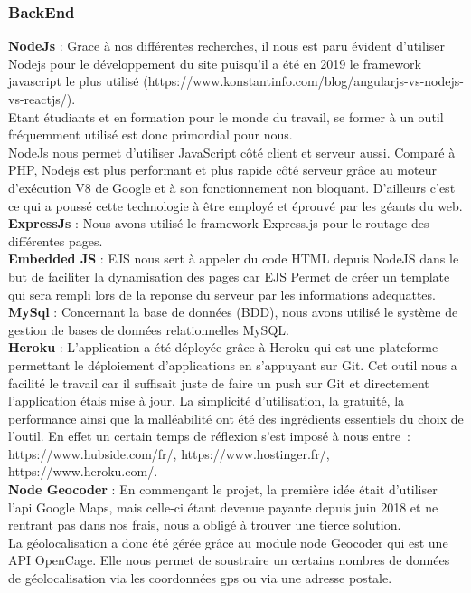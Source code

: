 \documentclass{article}
\begin{document}
\subsubsection{BackEnd}
\textbf{NodeJs} : Grace à nos différentes recherches, il nous est paru évident d’utiliser Nodejs pour le développement du site puisqu’il a été en 2019 le framework javascript le plus utilisé (https://www.konstantinfo.com/blog/angularjs-vs-nodejs-vs-reactjs/). \\ Etant étudiants et en formation pour le monde du travail, se former à un outil fréquemment utilisé est donc primordial pour nous. \\
NodeJs nous permet d’utiliser JavaScript côté client et serveur aussi. Comparé à PHP, Nodejs est plus performant et plus rapide côté serveur grâce au moteur d’exécution V8 de Google et à son fonctionnement non bloquant. D’ailleurs c’est ce qui a poussé cette technologie à être employé et éprouvé par les géants du web. \\
\textbf{ExpressJs} :
Nous avons utilisé le framework Express.js pour le routage des différentes pages. \\ 
\textbf{Embedded JS} :
EJS nous sert à appeler du code HTML depuis NodeJS dans le but de faciliter la dynamisation des pages car EJS Permet de créer un template qui sera rempli lors de la reponse du serveur par les informations adequattes. \\
\textbf{MySql} :
Concernant la base de données (BDD), nous avons utilisé le système de gestion de bases de données relationnelles MySQL. \\
\textbf{Heroku} :
L’application a été déployée grâce à Heroku qui est une plateforme permettant le déploiement d’applications en s'appuyant sur Git. Cet outil nous a facilité le travail car il suffisait juste de faire un push sur Git et directement l’application étais mise à jour. La simplicité d’utilisation, la gratuité, la performance ainsi que la malléabilité ont été des ingrédients essentiels du choix de l’outil. En effet un certain temps de réflexion s’est imposé à nous entre : https://www.hubside.com/fr/, https://www.hostinger.fr/, https://www.heroku.com/. \\
\textbf{Node Geocoder } :
En commençant le projet, la première idée était d’utiliser l’api Google Maps, mais celle-ci étant devenue payante depuis juin 2018 et ne rentrant pas dans nos frais,  nous a obligé à trouver une tierce solution.  \\ La géolocalisation a donc été gérée grâce au module node Geocoder qui est une API OpenCage. Elle nous permet de soustraire un certains nombres de données de géolocalisation via les coordonnées gps ou via une adresse postale. 
\end{document}
